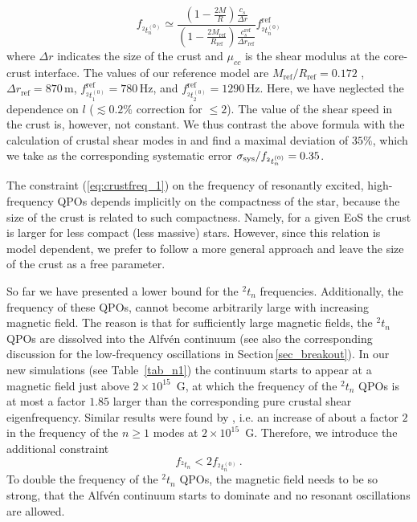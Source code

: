 \documentclass[useAMS,usenatbib]{mnras}
\begin{document}
\begin{equation}
f_{^2t^{(0)}_n}\simeq\frac{\left(1-\frac{2M}{R}\right)\frac{c_s}{\Delta 
r}}{\left(1-\frac{2M_\mathrm{ref}}{R_\mathrm{ref}}\right)\frac{c_s^\mathrm
{ref } } { \Delta r_\mathrm{ref}}} 
f^\mathrm{ref}_{^2t^{(0)}_n}\label{eq:crustfreq}
\end{equation}
where $\Delta r$ indicates the size of the crust and $\mu_{cc}$ is the 
shear modulus at the core-crust interface. The values of our reference model 
are $M_\mathrm{ref}/R_\mathrm{ref}=0.172$ 
, $\Delta r_\mathrm{ref}=870\,$m, $f^\mathrm{ref}_{^2t^{(0)}_1}=780\,$Hz, and 
$f^\mathrm{ref}_{^2t^{(0)}_2}=1290\,$Hz. Here, we have neglected the 
dependence on $l$ ($\lesssim 0.2\%$ correction for $\leqslant 2$). The 
value of the shear speed in the crust is, however, not constant. 
We thus contrast the above formula with the calculation of crustal shear modes 
in \cite{Sotani2007} and find a maximal deviation of $35\%$, which we take as 
the corresponding systematic error $\sigma_{\rm sys} / f_{^2t^{(0)}_n} =0.35$. 

The constraint (\ref{eq:crustfreq_1}) on the frequency of resonantly excited, high-frequency QPOs depends implicitly on the compactness of the star, because the size of the crust is related to such compactness. Namely, for a given EoS the crust is larger for less compact (less massive) stars. However, since this relation is model dependent, we prefer to follow a more general approach and leave the size of the crust as a free parameter.  

So far we have presented a lower bound for  the $^2t_n$ frequencies. 
Additionally, the frequency of these QPOs, cannot become arbitrarily large with 
increasing magnetic field. The reason is that for sufficiently large magnetic 
fields, the $^2t_n$ QPOs are dissolved into the Alfv\'en continuum (see 
also the corresponding discussion for the low-frequency oscillations in 
Section\,\ref{sec_breakout}). In our new simulations (see Table~\ref{tab_n1}) 
the continuum starts 
to appear at a magnetic field just above $2\times10^{15}$~G, at which the 
frequency of the $^2t_n$ QPOs is at most a factor $1.85$ larger than the  
corresponding pure crustal shear eigenfrequency. Similar results were found by 
\cite{vanHoven2012}, i.e. an increase of about a factor $2$ in the frequency of 
the $n\ge1$ modes at $2\times10^{15}$~G. Therefore, we introduce the 
additional constraint
%
\begin{equation}
f_{^2t_n} < 2 f_{^2t^{(0)}_n}\,. \label{eq:highmax}
\end{equation}
%
To double the frequency of the ${^2t_n}$ QPOs, the magnetic field 
needs to be so strong, that the Alfv\'en continuum starts to dominate and no 
resonant oscillations are allowed.
\end{document}
